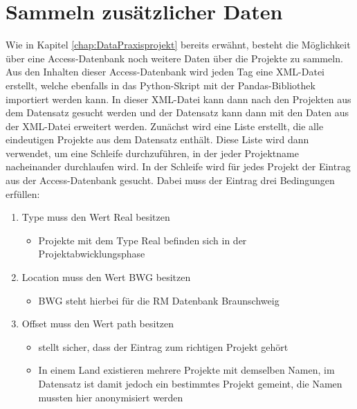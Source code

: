 \section{Sammeln zusätzlicher Daten}
\label{chap:DatenSammeln}
Wie in Kapitel \ref*{chap:DataPraxisprojekt} bereits erwähnt, besteht die Möglichkeit über eine Access-Datenbank noch weitere Daten über die Projekte zu sammeln.
Aus den Inhalten dieser Access-Datenbank wird jeden Tag eine XML-Datei erstellt, welche ebenfalls in das Python-Skript mit der Pandas-Bibliothek importiert werden kann.
In dieser XML-Datei kann dann nach den Projekten aus dem Datensatz gesucht werden und der Datensatz kann dann mit den Daten aus der XML-Datei erweitert werden.
Zunächst wird eine Liste erstellt, die alle eindeutigen Projekte aus dem Datensatz enthält. Diese Liste wird dann verwendet, um eine Schleife durchzuführen, 
in der jeder Projektname nacheinander durchlaufen wird. In der Schleife wird für jedes Projekt der Eintrag aus der Access-Datenbank gesucht.
Dabei muss der Eintrag drei Bedingungen erfüllen:
\begin{enumerate}[topsep=0pt,itemsep=-1ex,partopsep=1ex,parsep=1ex]
    \item \glqq Type\grqq{} muss den Wert \glqq Real\grqq{} besitzen
        \begin{itemize}[itemindent=0cm]
            \item Projekte mit dem \glqq Type\grqq{} \glqq Real\grqq{} befinden sich in der Projektabwicklungsphase
        \end{itemize}
    \item \glqq Location\grqq{} muss den Wert \glqq BWG\grqq{} besitzen
        \begin{itemize}[itemindent=0cm]
            \item \glqq BWG\grqq{} steht hierbei für die \ac{RM} Datenbank Braunschweig
        \end{itemize}
    \item \glqq Offset\grqq{} muss den Wert \glqq path\grqq{} besitzen
        \begin{itemize}[itemindent=0cm]
            \item stellt sicher, dass der Eintrag zum richtigen Projekt gehört
            \item In einem Land existieren mehrere Projekte mit demselben Namen, im Datensatz ist damit jedoch ein bestimmtes Projekt gemeint, die Namen mussten hier anonymisiert werden
        \end{itemize}
\end{enumerate}
